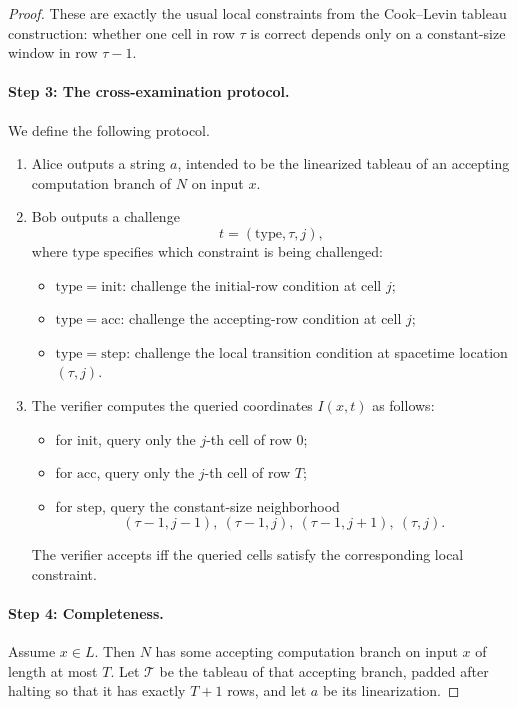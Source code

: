 \documentclass[11pt]{article}
\begin{document}
\begin{proof}
These are exactly the usual local constraints from the Cook--Levin tableau construction: whether one cell in row \(\tau\) is correct depends only on a constant-size window in row \(\tau-1\).

\paragraph{Step 3: The cross-examination protocol.}
We define the following protocol.

\begin{enumerate}
    \item Alice outputs a string \(a\), intended to be the linearized tableau of an accepting computation branch of \(N\) on input \(x\).
    \item Bob outputs a challenge
    \[
    t=(\mathrm{type},\tau,j),
    \]
    where \(\mathrm{type}\) specifies which constraint is being challenged:
    \begin{itemize}
        \item \(\mathrm{type}=\mathrm{init}\): challenge the initial-row condition at cell \(j\);
        \item \(\mathrm{type}=\mathrm{acc}\): challenge the accepting-row condition at cell \(j\);
        \item \(\mathrm{type}=\mathrm{step}\): challenge the local transition condition at spacetime location \((\tau,j)\).
    \end{itemize}
    \item The verifier computes the queried coordinates \(I(x,t)\) as follows:
    \begin{itemize}
        \item for \(\mathrm{init}\), query only the \(j\)-th cell of row \(0\);
        \item for \(\mathrm{acc}\), query only the \(j\)-th cell of row \(T\);
        \item for \(\mathrm{step}\), query the constant-size neighborhood
        \[
        (\tau-1,j-1),\ (\tau-1,j),\ (\tau-1,j+1),\ (\tau,j).
        \]
    \end{itemize}
    The verifier accepts iff the queried cells satisfy the corresponding local constraint.
\end{enumerate}

\paragraph{Step 4: Completeness.}
Assume \(x\in L\). Then \(N\) has some accepting computation branch on input \(x\) of length at most \(T\). Let \(\mathcal{T}\) be the tableau of that accepting branch, padded after halting so that it has exactly \(T+1\) rows, and let \(a\) be its linearization.


\end{proof}
\end{document}
